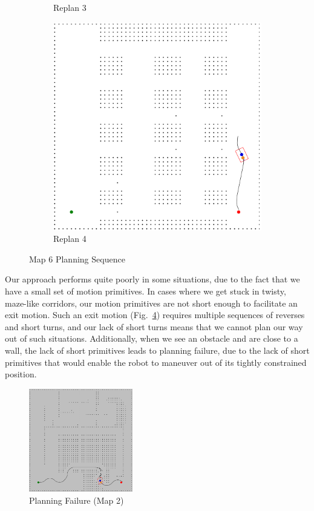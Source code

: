 \documentclass{article}
\begin{document}
\begin{figure}[ht]
\begin{subfigure}[b]{0.3\textwidth}
        \caption{Replan 3}
        \label{fig:map64}
    \end{subfigure}
    \begin{subfigure}[b]{0.3\textwidth}
        \includegraphics[width = \textwidth]{map6plan3_4.png}
        \caption{Replan 4}
        \label{fig:map65}
    \end{subfigure}
    \caption{Map 6 Planning Sequence}
    \label{fig:map6good}
\end{figure}

Our approach performs quite poorly in some situations, due to the fact that we have a small set of motion primitives. In cases where we get stuck in twisty, maze-like corridors, our motion primitives are not short enough to facilitate an exit motion. Such an exit motion (Fig.~\ref{fig:stuck}) requires multiple sequences of reverses and short turns, and our lack of short turns means that we cannot plan our way out of such situations. Additionally, when we see an obstacle and are close to a wall, the lack of short primitives leads to planning failure, due to the lack of short primitives that would enable the robot to maneuver out of its tightly constrained position.

\begin{figure}[ht]
\centering
\includegraphics[width=128pt,keepaspectratio]{stuck_in_map2_S.png}
\caption{Planning Failure (Map 2)}
\label{fig:stuck}
\end{figure}
\end{document}
